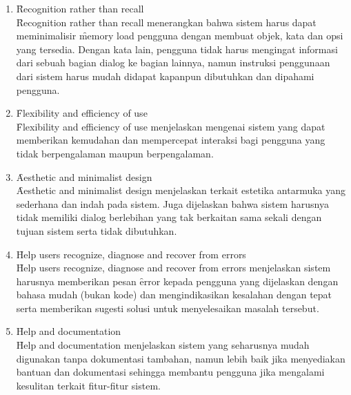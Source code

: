 \begin{enumerate}
	\item \f{Recognition rather than recall}\\
	\f{Recognition rather than recall} menerangkan bahwa sistem harus dapat meminimalisir \f{memory load} pengguna dengan membuat objek, kata dan opsi yang tersedia. Dengan kata lain, pengguna tidak harus mengingat informasi dari sebuah bagian dialog ke bagian lainnya, namun instruksi penggunaan dari sistem harus mudah didapat kapanpun dibutuhkan dan dipahami pengguna.
	\item \f{Flexibility and efficiency of use}\\
	\f{Flexibility and efficiency of use} menjelaskan mengenai sistem yang dapat memberikan kemudahan dan mempercepat interaksi bagi pengguna yang tidak berpengalaman maupun berpengalaman.
	\item \f{Aesthetic and minimalist design}\\
	\f{Aesthetic and minimalist design} menjelaskan terkait estetika antarmuka yang sederhana dan indah pada sistem. Juga dijelaskan bahwa sistem harusnya tidak memiliki dialog berlebihan yang tak berkaitan sama sekali dengan tujuan sistem serta tidak dibutuhkan. 
	\item \f{Help users recognize, diagnose and recover from errors}\\
	\f{Help users recognize, diagnose and recover from errors} menjelaskan sistem harusnya memberikan pesan \f{error} kepada pengguna yang dijelaskan dengan bahasa mudah (bukan kode) dan mengindikasikan kesalahan dengan tepat serta memberikan sugesti solusi untuk menyelesaikan masalah tersebut.
	\item \f{Help and documentation}\\
	\f{Help and documentation} menjelaskan sistem yang seharusnya mudah digunakan tanpa dokumentasi tambahan, namun lebih baik jika menyediakan bantuan dan dokumentasi sehingga membantu pengguna jika mengalami kesulitan terkait fitur-fitur sistem.
\end{enumerate}
